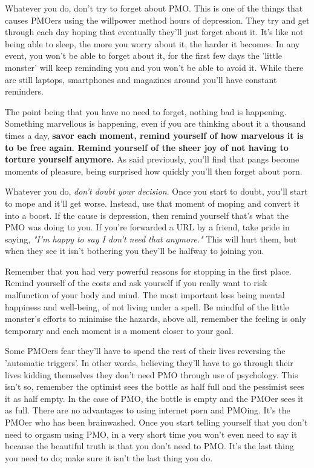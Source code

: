 \documentclass[easypeasy.tex]{subfiles}
\begin{document}
Whatever you do, don't try to forget about PMO. This is one of the things that causes PMOers using the willpower method hours of depression. They try and get through each day hoping that eventually they'll just forget about it. It's like not being able to sleep, the more you worry about it, the harder it becomes. In any event, you won't be able to forget about it, for the first few days the 'little monster' will keep reminding you and you won't be able to avoid it. While there are still laptops, smartphones and magazines around you'll have constant reminders.

The point being that you have no need to forget, nothing bad is happening. Something marvellous is happening, even if you are thinking about it a thousand times a day, \textbf{savor each moment, remind yourself of how marvelous it is to be free again. Remind yourself of the sheer joy of not having to torture yourself anymore.} As said previously, you'll find that pangs become moments of pleasure, being surprised how quickly you'll then forget about porn.

Whatever you do, \textit{don't doubt your decision}. Once you start to doubt, you'll start to mope and it'll get worse. Instead, use that moment of moping and convert it into a boost. If the cause is depression, then remind yourself that's what the PMO was doing to you. If you're forwarded a URL by a friend, take pride in saying, \textit{"I'm happy to say I don't need that anymore."} This will hurt them, but when they see it isn't bothering you they'll be halfway to joining you.

Remember that you had very powerful reasons for stopping in the first place. Remind yourself of the costs and ask yourself if you really want to risk malfunction of your body and mind. The most important loss being mental happiness and well-being, of not living under a spell. Be mindful of the little monster's efforts to minimise the hazards, above all, remember the feeling is only temporary and each moment is a moment closer to your goal.

Some PMOers fear they'll have to spend the rest of their lives reversing the 'automatic triggers'. In other words, believing they'll have to go through their lives kidding themselves they don't need PMO through use of psychology. This isn't so, remember the optimist sees the bottle as half full and the pessimist sees it as half empty. In the case of PMO, the bottle is empty and the PMOer sees it as full. There are no advantages to using internet porn and PMOing. It's the PMOer who has been brainwashed. Once you start telling yourself that you don't need to orgasm using PMO, in a very short time you won't even need to say it because the beautiful truth is that you don't need to PMO. It's the last thing you need to do; make sure it isn't the last thing you do.
\end{document}
